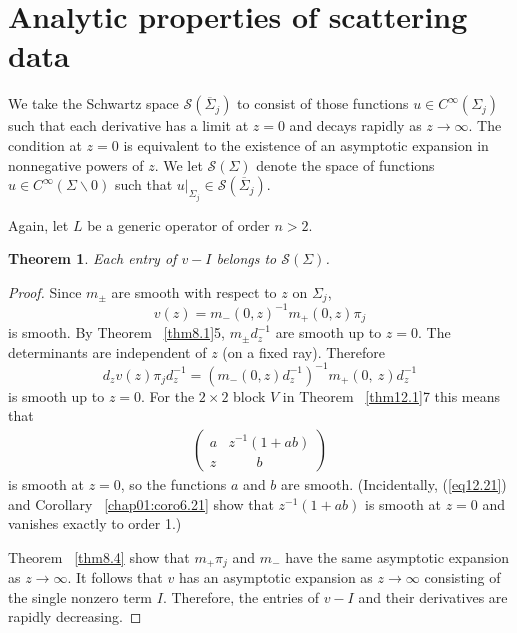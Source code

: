 \documentclass{surv-l}
\theoremstyle{plain}
\newtheorem{theorem}{Theorem}[section]
\theoremstyle{definition}
\numberwithin{equation}{chapter}
\begin{document}
\section{Analytic properties of scattering data}\label{sec13}
We take the Schwartz space $\mathscr{S}(\overline{\Sigma}_{j})$ to consist of those functions $u\in C^{\infty}(\Sigma_{j})$ such that each derivative has a limit at $z=0$ and decays rapidly as $z\rightarrow\infty$. The condition at $z=0$ is equivalent to the existence of an asymptotic expansion in nonnegative powers of $z$. We let $\mathscr{S}(\Sigma)$ denote the space of functions $u\in C^{\infty}(\Sigma\backslash 0)$ such that $u|_{\Sigma_{j}}\in \mathscr{S}(\overline{\Sigma}_{j})$.

Again, let $L$ be a generic operator of order $n>2$.
\setcounter{theorem}{0}
\begin{theorem}\label{thm13.1}
Each entry of $v-I$ belongs to $\mathscr{S}(\Sigma)$.
\end{theorem}
\begin{proof}
Since $m_{\pm}$ are smooth with respect to $z$ on $\Sigma_{j}$,
\setcounter{equation}{1}
\begin{equation}\label{eq13.2}
v(z)=m_{-}(0, z)^{-1}m_{+}(0, z)\pi_{j}
\end{equation}
is smooth. By Theorem ~\ref{thm8.1}5, $m_{\pm} d_{z}^{-1}$ are smooth up to $z=0$. The determinants are independent of $z$ (on a fixed ray). Therefore
\begin{equation}\label{eq13.3}
d_{z}v(z)\pi_{j}d_{z}^{-1}=(m_{-}(0, z)d_{z}^{-1})^{-1}m_{+}(0,\ z)d_{z}^{-1}
\end{equation}
is smooth up to $z=0$. For the $2\times 2$ block $V$ in Theorem ~\ref{thm12.1}7 this means that
\begin{align*}
\left(\begin{array}{ll}
a & z^{-1}(1+ab)\\
z & \qquad b
\end{array}\right)
\end{align*}
is smooth at $z =0$, so the functions $a$ and $b$ are smooth. (Incidentally, (\ref{eq12.21}) and Corollary ~\ref{chap01:coro6.21} show that $z^{-1}(1+ab)$ is smooth at $z=0$ and vanishes exactly to order 1.)

Theorem ~\ref{thm8.4} show that $m_{+}\pi_{j}$ and $m_{-}$ have the same asymptotic expansion as $ z\rightarrow\infty$. It follows that $v$ has an asymptotic expansion as $ z\rightarrow\infty$ consisting
of the single nonzero term $I$. Therefore, the entries of $v-I$ and their derivatives are rapidly decreasing.
\end{proof}
\end{document}
